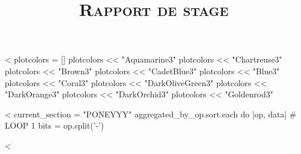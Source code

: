 \documentclass[a4paper,frenchb,12pt]{article}
\title{\textsc{\LARGE Rapport de stage}}
\author{}
\date{}
\begin{document}
\tableofcontents
\newpage

<%
plotcolors = []
plotcolors << "Aquamarine3"
plotcolors << "Chartreuse3"
plotcolors << "Brown3"
plotcolors << "CadetBlue3"
plotcolors << "Blue3"
plotcolors << "Coral3"
plotcolors << "DarkOliveGreen3"
plotcolors << "DarkOrange3"
plotcolors << "DarkOrchid3"
plotcolors << "Goldenrod3"



<%
current_section = "PONEYYY"
aggregated_by_op.sort.each do |op, data|                    # LOOP 1
bits = op.split('-')

<%
\end{document}
